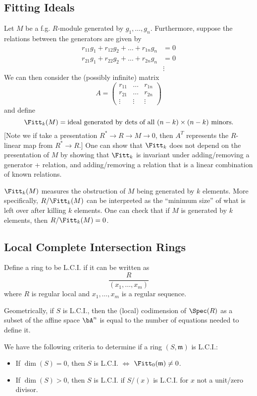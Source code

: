 \subsection{Fitting Ideals}
Let $M$ be a f.g. $R$-module generated by $g_1, \dots, g_n$. Furthermore, suppose the relations between the generators are given by
\[
    \begin{split}
        r_{11}g_1 + r_{12}g_2 + \dots + r_{1n}g_n & = 0             \\
        r_{21}g_1 + r_{22}g_2 + \dots + r_{2n}g_n & = 0             \\
                                                  & \vdots
    \end{split}
\]
We can then consider the (possibly infinite) matrix
\[
    A = \begin{pmatrix}
        r_{11}                                    & \dots  & r_{1n} \\
        r_{21}                                    & \dots  & r_{2n} \\
        \vdots                                    & \vdots & \vdots
    \end{pmatrix}
\]
and define
\[
    \Fitt_k(M) = \text{ideal generated by dets of all $(n - k) \times (n - k)$ minors.}
\]
[Note we if take a presentation $R^* \to R \to M \to 0$, then $A^T$ represents the $R$-linear map from $R^* \to R$.] One can show that $\Fitt_k$ does not depend on the presentation of $M$ by showing that $\Fitt_k$ is invariant under adding/removing a generator + relation, and adding/removing a relation that is a linear combination of known relations.

$\Fitt_k(M)$ measures the obstruction of $M$ being generated by $k$ elements. More specifically, $R/\Fitt_k(M)$ can be interpreted as the ``minimum size'' of what is left over after killing $k$ elements. One can check that if $M$ is generated by $k$ elements, then $R/\Fitt_k(M) = 0$.

\subsection{Local Complete Intersection Rings}
Define a ring to be L.C.I. if it can be written as
\[
    \frac{R}{(x_1, \dots, x_m)}
\]
where $R$ is regular local and $x_1, \dots, x_m$ is a regular sequence.

Geometrically, if $S$ is L.C.I., then the (local) codimension of $\Spec(R)$ as a subset of the affine space $\bA^n$ is equal to the number of equations needed to define it.

We have the following criteria to determine if a ring $(S, \mathfrak m)$ is L.C.I.:
\begin{itemize}
    \item If $\dim(S) = 0$, then $S$ is L.C.I. $\iff$ $\Fitt_0(\mathfrak m) \neq 0$.
    \item If $\dim(S) > 0$, then $S$ is L.C.I. if $S/(x)$ is L.C.I. for $x$ not a unit/zero divisor.
\end{itemize}

